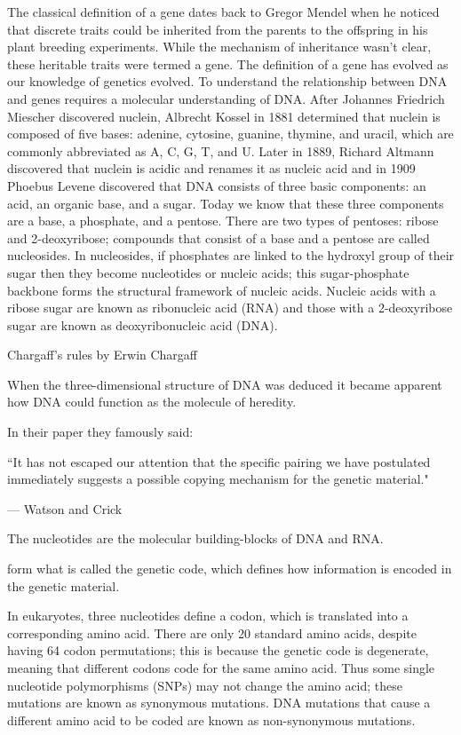 The classical definition of a gene dates back to Gregor Mendel when he noticed that discrete traits could be inherited from the parents to the offspring in his plant breeding experiments. While the mechanism of inheritance wasn't clear, these heritable traits were termed a gene. The definition of a gene has evolved as our knowledge of genetics evolved\cite{pmid17567988}. To understand the relationship between DNA and genes requires a molecular understanding of DNA. After Johannes Friedrich Miescher discovered nuclein, Albrecht Kossel in 1881 determined that nuclein is composed of five bases: adenine, cytosine, guanine, thymine, and uracil, which are commonly abbreviated as A, C, G, T, and U. Later in 1889, Richard Altmann discovered that nuclein is acidic and renames it as nucleic acid and in 1909 Phoebus Levene discovered that DNA consists of three basic components: an acid, an organic base, and a sugar. Today we know that these three components are a base, a phosphate, and a pentose. There are two types of pentoses: ribose and 2-deoxyribose; compounds that consist of a base and a pentose are called nucleosides. In nucleosides, if phosphates are linked to the hydroxyl group of their sugar then they become nucleotides or nucleic acids; this sugar-phosphate backbone forms the structural framework of nucleic acids. Nucleic acids with a ribose sugar are known as ribonucleic acid (RNA) and those with a 2-deoxyribose sugar are known as deoxyribonucleic acid (DNA).

Chargaff's rules by Erwin Chargaff

When the three-dimensional structure of DNA was deduced\cite{WATSON_1953} it became apparent how DNA could function as the molecule of heredity. 

In their paper they famously said:

\epigraph{``It has not escaped our attention that the specific pairing we have postulated immediately suggests a possible copying mechanism for the genetic material."}{--- \textup{Watson and Crick}}

The nucleotides are the molecular building-blocks of DNA and RNA.

form what is called the genetic code\cite{pmid5330357}, which defines how information is encoded in the genetic material. 

In eukaryotes, three nucleotides define a codon, which is translated into a corresponding amino acid. There are only 20 standard amino acids, despite having 64 codon permutations; this is because the genetic code is degenerate, meaning that different codons code for the same amino acid. Thus some single nucleotide polymorphisms (SNPs) may not change the amino acid; these mutations are known as synonymous mutations. DNA mutations that cause a different amino acid to be coded are known as non-synonymous mutations. 

